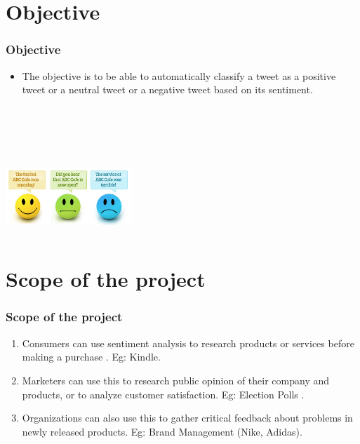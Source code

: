 \documentclass[12pt,xcolor=dvipsnames,table,titlepage]{beamer}
\begin{document}
\section{Objective}
\begin{frame}[t]
\frametitle{Objective}
\begin{itemize}
 \item The objective is to be able to automatically classify a tweet as a positive tweet or a neutral tweet or a negative tweet based on its sentiment.
\end{itemize}
\\
\\
\\
\begin{center}
\includegraphics[width=180, height=110]{img1.jpg} 
\end{center}
\end{frame}

\section{Scope of the project}
\begin{frame}[t]
\frametitle{Scope of the project}
\begin{enumerate}
\item Consumers can use sentiment analysis to research products or services before making a purchase \cite{rp9}. Eg: Kindle.
\item Marketers can use this to research public opinion of their company and products, or to analyze customer satisfaction. Eg: Election Polls \cite{rp1}.
\item Organizations can also use this to gather critical feedback about problems in newly released products. Eg: Brand Management (Nike, Adidas).
\end{enumerate}
\end{frame}
\end{document}
